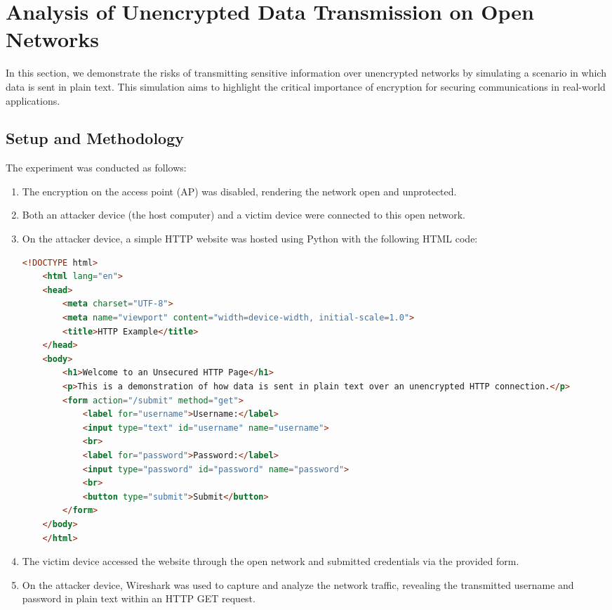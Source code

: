 \chapter{Analysis of Unencrypted Data Transmission on Open Networks}

In this section, we demonstrate the risks of transmitting sensitive information over unencrypted networks by simulating a scenario in which data is sent in plain text. This simulation aims to highlight the critical importance of encryption for securing communications in real-world applications.

\section{Setup and Methodology}

The experiment was conducted as follows:

\begin{enumerate}
    \item The encryption on the access point (AP) was disabled, rendering the network open and unprotected.
    \item Both an attacker device (the host computer) and a victim device were connected to this open network.
    \item On the attacker device, a simple HTTP website was hosted using Python with the following HTML code:
    
    \begin{adjustbox}{max width=\linewidth}
    \begin{lstlisting}[language=html]
    <!DOCTYPE html>
    <html lang="en">
    <head>
        <meta charset="UTF-8">
        <meta name="viewport" content="width=device-width, initial-scale=1.0">
        <title>HTTP Example</title>
    </head>
    <body>
        <h1>Welcome to an Unsecured HTTP Page</h1>
        <p>This is a demonstration of how data is sent in plain text over an unencrypted HTTP connection.</p>
        <form action="/submit" method="get">
            <label for="username">Username:</label>
            <input type="text" id="username" name="username">
            <br>
            <label for="password">Password:</label>
            <input type="password" id="password" name="password">
            <br>
            <button type="submit">Submit</button>
        </form>
    </body>
    </html>
    \end{lstlisting}
    \end{adjustbox}
    
    \item The victim device accessed the website through the open network and submitted credentials via the provided form.
    \item On the attacker device, Wireshark was used to capture and analyze the network traffic, revealing the transmitted username and password in plain text within an HTTP GET request.
\end{enumerate}

